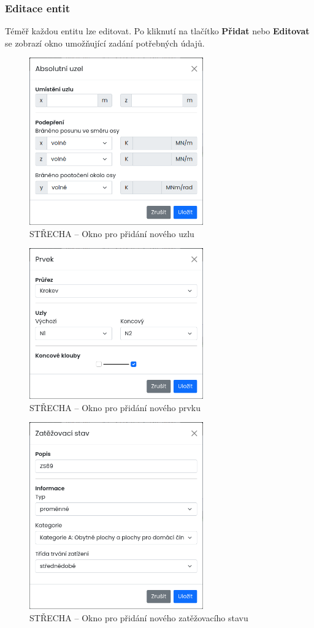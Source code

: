 \subsubsection*{Editace entit}
Téměř každou entitu lze editovat. Po kliknutí na tlačítko \textbf{Přidat} nebo \textbf{Editovat} se zobrazí okno umožňující zadání potřebných údajů.
\begin{figure}[H]
    \includegraphics[width=7.5cm]{assets/figures/wbapp/add_node_modal.png}
    \caption{STŘECHA -- Okno pro přidání nového uzlu}
    \label{fig:add_node}
\end{figure}

\begin{figure}[H]
    \includegraphics[width=7.5cm]{assets/figures/wbapp/add_member_modal.png}
    \caption{STŘECHA -- Okno pro přidání nového prvku}
    \label{fig:add_member}
\end{figure}

\begin{figure}[H]
    \includegraphics[width=7.5cm]{assets/figures/wbapp/add_load_Case_modal.png}
    \caption{STŘECHA -- Okno pro přidání nového zatěžovacího stavu}
    \label{fig:add_load_case}
\end{figure}

